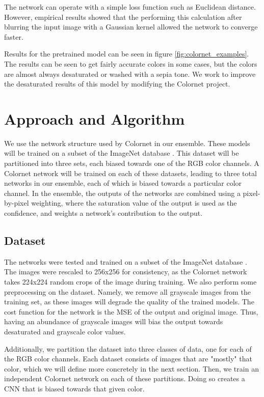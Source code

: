 \documentclass[10pt,twocolumn,letterpaper]{article}
\begin{document}
The network can operate with a simple loss function such as Euclidean distance. However, empirical results showed that the performing this calculation after blurring the input image with a Gaussian kernel allowed the network to converge faster\cite{ColorNet}.

Results for the pretrained model can be seen in figure \ref{fig:colornet_examples}. The results can be seen to get fairly accurate colors in some cases, but the colors are almost always desaturated or washed with a sepia tone. We work to improve the desaturated results of this model by modifying the Colornet project.

\section{Approach and Algorithm}

We use the network structure used by Colornet \cite{ColorNet} in our ensemble. These models will be trained on a subset of the ImageNet database \cite{Russakovsky2015}. This dataset will be partitioned into three sets, each biased towards one of the RGB color channels. A Colornet network will be trained on each of these datasets, leading to three total networks in our ensemble, each of which is biased towards a particular color channel. In the ensemble, the outputs of the networks are combined using a pixel-by-pixel weighting, where the saturation value of the output is used as the confidence, and weights a network's contribution to the output.

\subsection{Dataset}

The networks were tested and trained on a subset of the ImageNet database \cite{Russakovsky2015}. The images were rescaled to 256x256 for consistency, as the Colornet network takes 224x224 random crops of the image during training. We also perform some preprocessing on the dataset. Namely, we remove all grayscale images from the training set, as these images will degrade the quality of the trained models. The cost function for the network is the MSE of the output and original image. Thus, having an abundance of grayscale images will bias the output towards desaturated and grayscale color values.

Additionally, we partition the dataset into three classes of data, one for each of the RGB color channels. Each dataset consists of images that are "mostly" that color, which we will define more concretely in the next section. Then, we train an independent Colornet network on each of these partitions. Doing so creates a CNN that is biased towards that given color.
\end{document}
